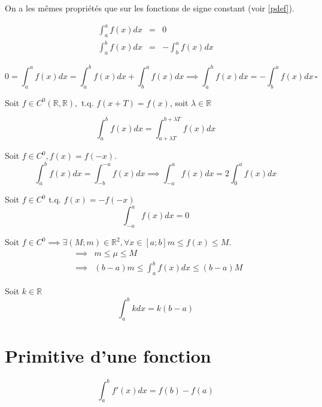 \begin{corollary}[Propriétés]
    On a les mêmes propriétés que sur les fonctions de signe constant (voir \autoref{pdef}). \par
    \begin{corollary}[Simplification]
        \begin{eqnarray*}
            \int_{a}^{a} f(x) dx &=& 0 \\
            \int_{a}^{b} f(x) dx &=& - \int_{b}^{a} f(x) dx
        \end{eqnarray*}
    \end{corollary}
    \begin{explanation}
        \[
            0 = \int_{a}^{a} f(x) dx = \int_{a}^{b} f(x) dx + \int_{b}^{a} f(x) dx \implies \int_{a}^{b} f(x) dx  = - \int_{b}^{a} f(x) dx \,\square
        \]
    \end{explanation}
    \begin{corollary}
        Soit \(f \in C^{0}(\mathbb{R},\mathbb{R}), \text{ t.q. } f(x+T) = f(x)\), soit \(\lambda \in \mathbb{R}\) \par
        \[
            \int_{a}^{b} f(x) dx = \int_{a+\lambda T}^{b+\lambda T}  f(x) dx
        \]
    \end{corollary}
    \begin{corollary}
        Soit \(f \in C^{0}, f(x) = f(-x)\).
        \[
            \int_{a}^{b} f(x) dx = \int_{-b}^{-a} f(x) dx \implies \int_{-a}^{a} f(x) dx = 2 \int_{0}^{a} f(x) dx
        \] 
    \end{corollary}

    \begin{corollary}
        Soit \(f \in C^{0} \text{ t.q. } f(x) = -f(-x)\)
        \[
            \int_{-a}^{a} f(x) dx = 0
        \] 
    \end{corollary}
    \begin{corollary}
        Soit \(f \in C^{0} \implies \exists (M;m) \in \mathbb{R}^{2}, \forall x \in [a;b] m \leq f(x) \leq M\). 
        \begin{eqnarray*}
            &\implies& m \leq \mu \leq M \\
            &\implies& (b-a)m \leq \int_{a}^{b} f(x) dx \leq (b-a)M
        \end{eqnarray*}
    \end{corollary}
\end{corollary}

\begin{remark} Soit \(k \in \mathbb{R}\) 
    \[
        \int_{a}^{b} k dx = k(b-a)
    \]
\end{remark}

\section{Primitive d'une fonction}

\begin{theorem}
    \[
        \int_{a}^{b} f'(x) dx = f(b) - f(a)
    \]
\end{theorem}